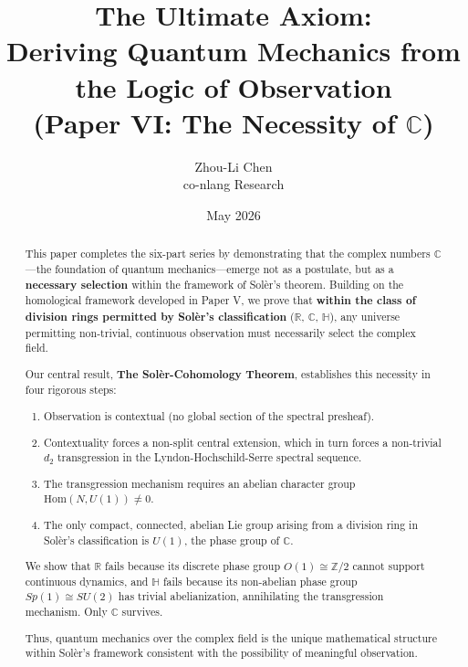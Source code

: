 \documentclass[11pt]{article}
\begin{document}
\title{The Ultimate Axiom:\\
Deriving Quantum Mechanics from the Logic of Observation\\
{\large (Paper VI: The Necessity of $\mathbb{C}$)}}

\author{Zhou-Li Chen \\ co-nlang Research}
\date{May 2026}

\maketitle

\begin{abstract}
This paper completes the six-part series by demonstrating that the complex numbers $\mathbb{C}$---the foundation of quantum mechanics---emerge not as a postulate, but as a \textbf{necessary selection} within the framework of Sol\`{e}r's theorem. Building on the homological framework developed in Paper V, we prove that \textbf{within the class of division rings permitted by Sol\`{e}r's classification} ($\mathbb{R}$, $\mathbb{C}$, $\mathbb{H}$), any universe permitting non-trivial, continuous observation must necessarily select the complex field.

Our central result, \textbf{The Sol\`{e}r-Cohomology Theorem}, establishes this necessity in four rigorous steps:
\begin{enumerate}
\item Observation is contextual (no global section of the spectral presheaf).
\item Contextuality forces a non-split central extension, which in turn forces a non-trivial $d_2$ transgression in the Lyndon-Hochschild-Serre spectral sequence.
\item The transgression mechanism requires an abelian character group $\mathrm{Hom}(N, U(1)) \neq 0$.
\item The only compact, connected, abelian Lie group arising from a division ring in Sol\`{e}r's classification is $U(1)$, the phase group of $\mathbb{C}$.
\end{enumerate}

We show that $\mathbb{R}$ fails because its discrete phase group $O(1) \cong \mathbb{Z}/2$ cannot support continuous dynamics, and $\mathbb{H}$ fails because its non-abelian phase group $Sp(1) \cong SU(2)$ has trivial abelianization, annihilating the transgression mechanism. Only $\mathbb{C}$ survives.

Thus, quantum mechanics over the complex field is the unique mathematical structure within Sol\`{e}r's framework consistent with the possibility of meaningful observation.
\end{abstract}
\end{document}
